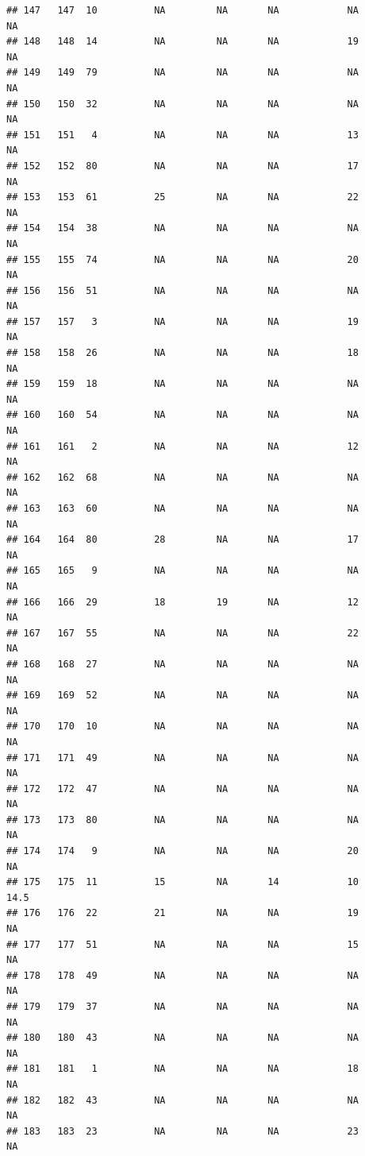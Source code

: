 \documentclass[man]{apa6}
\begin{document}
\begin{verbatim}
## 147   147  10          NA         NA       NA            NA       NA
## 148   148  14          NA         NA       NA            19       NA
## 149   149  79          NA         NA       NA            NA       NA
## 150   150  32          NA         NA       NA            NA       NA
## 151   151   4          NA         NA       NA            13       NA
## 152   152  80          NA         NA       NA            17       NA
## 153   153  61          25         NA       NA            22       NA
## 154   154  38          NA         NA       NA            NA       NA
## 155   155  74          NA         NA       NA            20       NA
## 156   156  51          NA         NA       NA            NA       NA
## 157   157   3          NA         NA       NA            19       NA
## 158   158  26          NA         NA       NA            18       NA
## 159   159  18          NA         NA       NA            NA       NA
## 160   160  54          NA         NA       NA            NA       NA
## 161   161   2          NA         NA       NA            12       NA
## 162   162  68          NA         NA       NA            NA       NA
## 163   163  60          NA         NA       NA            NA       NA
## 164   164  80          28         NA       NA            17       NA
## 165   165   9          NA         NA       NA            NA       NA
## 166   166  29          18         19       NA            12       NA
## 167   167  55          NA         NA       NA            22       NA
## 168   168  27          NA         NA       NA            NA       NA
## 169   169  52          NA         NA       NA            NA       NA
## 170   170  10          NA         NA       NA            NA       NA
## 171   171  49          NA         NA       NA            NA       NA
## 172   172  47          NA         NA       NA            NA       NA
## 173   173  80          NA         NA       NA            NA       NA
## 174   174   9          NA         NA       NA            20       NA
## 175   175  11          15         NA       14            10     14.5
## 176   176  22          21         NA       NA            19       NA
## 177   177  51          NA         NA       NA            15       NA
## 178   178  49          NA         NA       NA            NA       NA
## 179   179  37          NA         NA       NA            NA       NA
## 180   180  43          NA         NA       NA            NA       NA
## 181   181   1          NA         NA       NA            18       NA
## 182   182  43          NA         NA       NA            NA       NA
## 183   183  23          NA         NA       NA            23       NA

\end{verbatim}
\end{document}
